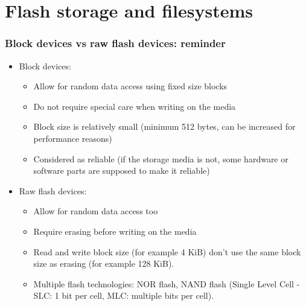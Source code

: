 \section{Flash storage and filesystems}

\begin{frame}
  \frametitle{Block devices vs raw flash devices: reminder}
  \begin{itemize}
  \item Block devices:
    \begin{itemize}
    \item Allow for random data access using fixed size blocks
    \item Do not require special care when writing on the media
    \item Block size is relatively small (minimum 512 bytes, can be
      increased for performance reasons)
    \item Considered as reliable (if the storage media is not, some
      hardware or software parts are supposed to make it reliable)
    \end{itemize}
  \item Raw flash devices:
    \begin{itemize}
    \item Allow for random data access too
    \item Require erasing before writing on the media
    \item Read and write block size (for example 4 KiB) don't use
          the same block size as erasing (for example 128 KiB).
    \item Multiple flash technologies: NOR flash, NAND
          flash (Single Level Cell - SLC: 1 bit per cell, MLC: multiple bits per cell).
    \end{itemize}
  \end{itemize}
\end{frame}

